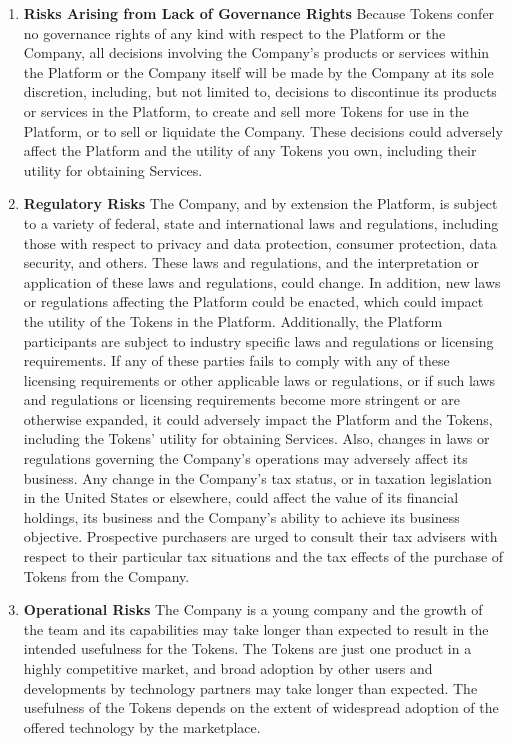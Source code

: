 \begin{enumerate}
    \item \textbf{Risks Arising from Lack of Governance Rights}
    Because Tokens confer no governance rights of any kind with respect to the Platform or the Company, all decisions involving the Company’s products or services within the Platform or the Company itself will be made by the Company at its sole discretion, including, but not limited to, decisions to discontinue its products or services in the  Platform, to create and sell more Tokens for use in the Platform, or to sell or liquidate the Company. These decisions could adversely affect the Platform and the utility of any Tokens you own, including their utility for obtaining Services.
    
    \item \textbf{Regulatory Risks}
    The Company, and by extension the Platform, is subject to a variety of federal, state and international laws and regulations, including those with respect to privacy and data protection, consumer protection, data security, and others. These laws and regulations, and the interpretation or application of these laws and regulations, could change. In addition, new laws or regulations affecting the Platform could be enacted, which could impact the utility of the Tokens in the Platform. Additionally, the Platform participants are subject to industry specific laws and regulations or licensing requirements. If any of these parties fails to comply with any of these licensing requirements or other applicable laws or regulations, or if such laws and regulations or licensing requirements become more stringent or are otherwise expanded, it could adversely impact the Platform and the Tokens, including the Tokens’ utility for obtaining Services. Also, changes in laws or regulations governing the Company's operations may adversely affect its business. Any change in the Company's tax status, or in taxation legislation in the United States or elsewhere, could affect the value of its financial holdings, its business and the Company's ability to achieve its business objective. Prospective purchasers are urged to consult their tax advisers with respect to their particular tax situations and the tax effects of the purchase of Tokens from the Company.
    
    \item \textbf{Operational Risks}
    The Company is a young company and the growth of the team and its capabilities may take longer than expected to result in the intended usefulness for the Tokens. The Tokens are just one product in a highly competitive market, and broad adoption by other users and developments by technology partners may take longer than expected. The usefulness of the Tokens depends on the extent of widespread adoption of the offered technology by the marketplace.
    

\end{enumerate}
